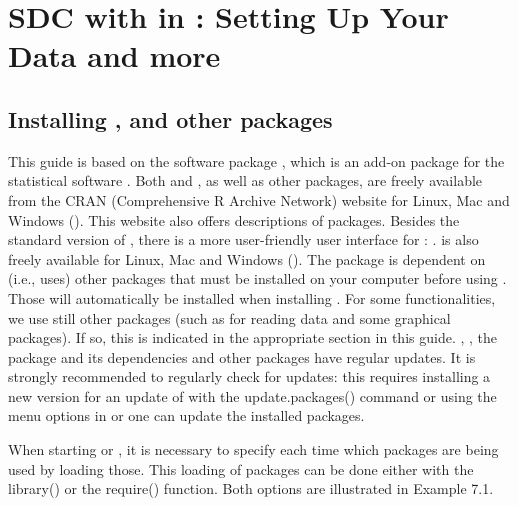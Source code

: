 \documentclass[letterpaper,10pt,english]{sphinxmanual}
\begin{document}
\chapter{SDC with  in : Setting Up Your Data and more}
\label{\detokenize{sdcMicro::doc}}\label{\detokenize{sdcMicro:sdc-with-sdcmicro-in-r-setting-up-your-data-and-more}}

\section{Installing ,  and other packages}
\label{\detokenize{sdcMicro:installing-r-sdcmicro-and-other-packages}}
This guide is based on the software package , which is an
add-on package for the statistical software . Both  and
, as well as other  packages, are freely available from the
CRAN (Comprehensive R Archive Network) website for Linux, Mac and
Windows (). This website also offers
descriptions of packages. Besides the standard version of , there is
a more user-friendly user interface for : .  is
also freely available for Linux, Mac and Windows
(). The  package is dependent on (i.e.,
uses) other  packages that must be installed on your computer before
using . Those will automatically be installed when installing
. For some functionalities, we use still other packages (such
as  for reading data and some graphical packages). If so, this
is indicated in the appropriate section in this guide. , ,
the  package and its dependencies and other packages have
regular updates. It is strongly recommended to regularly check for
updates: this requires installing a new version for an update of 
with the update.packages() command or using the menu options in  or
 one can update the installed packages.

When starting  or , it is necessary to specify each time
which packages are being used by loading those. This loading of packages
can be done either with the library() or the require() function. Both
options are illustrated in Example 7.1.
\end{document}
